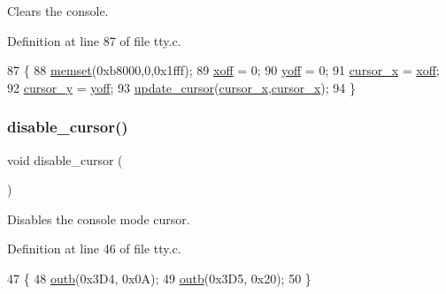 Clears the console. 



Definition at line 87 of file tty.\+c.


\begin{DoxyCode}
87                    \{
88     \hyperlink{a00125_a9e432f267691eceb2e2e0efcc37efbc9_a9e432f267691eceb2e2e0efcc37efbc9}{memset}(0xb8000,0,0x1fff);
89     \hyperlink{a00173_abaa0d20f0e52ce0d3a7d706f6ac16266_abaa0d20f0e52ce0d3a7d706f6ac16266}{xoff} = 0;
90     \hyperlink{a00173_a1a7539764d0ae8cd06ce45c62cf92bca_a1a7539764d0ae8cd06ce45c62cf92bca}{yoff} = 0;
91     \hyperlink{a00173_ae69604af0f9bd5fca2a016d0aa1ba7e1_ae69604af0f9bd5fca2a016d0aa1ba7e1}{cursor\_x} = \hyperlink{a00173_abaa0d20f0e52ce0d3a7d706f6ac16266_abaa0d20f0e52ce0d3a7d706f6ac16266}{xoff};
92     \hyperlink{a00173_a0301c5492919c401c2c1ecf52af709b0_a0301c5492919c401c2c1ecf52af709b0}{cursor\_y} = \hyperlink{a00173_a1a7539764d0ae8cd06ce45c62cf92bca_a1a7539764d0ae8cd06ce45c62cf92bca}{yoff};
93     \hyperlink{a00173_a492f5021d7340613e732ef37bbaa04e4_a492f5021d7340613e732ef37bbaa04e4}{update\_cursor}(\hyperlink{a00173_ae69604af0f9bd5fca2a016d0aa1ba7e1_ae69604af0f9bd5fca2a016d0aa1ba7e1}{cursor\_x},\hyperlink{a00173_ae69604af0f9bd5fca2a016d0aa1ba7e1_ae69604af0f9bd5fca2a016d0aa1ba7e1}{cursor\_x});
94 \}
\end{DoxyCode}
\mbox{\label{a00173_a3d09038c7b6436e60b228f2f3f451f6a_a3d09038c7b6436e60b228f2f3f451f6a}} 
\subsubsection{\texorpdfstring{disable\+\_\+cursor()}{disable\_cursor()}}
{\footnotesize\ttfamily void disable\+\_\+cursor (\begin{DoxyParamCaption}{ }\end{DoxyParamCaption})}



Disables the console mode cursor. 



Definition at line 46 of file tty.\+c.


\begin{DoxyCode}
47 \{
48     \hyperlink{a00158_aa37f5841c54156a4b14fc0d6f626b44f_aa37f5841c54156a4b14fc0d6f626b44f}{outb}(0x3D4, 0x0A);
49     \hyperlink{a00158_aa37f5841c54156a4b14fc0d6f626b44f_aa37f5841c54156a4b14fc0d6f626b44f}{outb}(0x3D5, 0x20);
50 \}
\end{DoxyCode}
\mbox{\label{a00173_acb9a978008cfa67b0038e85eb56d2d41_acb9a978008cfa67b0038e85eb56d2d41}} 
